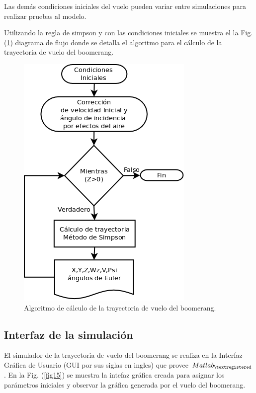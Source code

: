 	Las demás condiciones iniciales del vuelo pueden variar entre simulaciones para realizar pruebas al modelo.

	Utilizando la regla de simpson y con las condiciones iniciales se muestra el la Fig. (\ref{fig14}) diagrama de flujo donde se detalla el algoritmo para el cálculo de la trayectoria de vuelo del boomerang.

		\begin{figure}[h]
		\begin{center}
		\includegraphics[scale=0.4]{imagenes/3-boomerang/diag_flu_tra.png}
		\caption{Algoritmo de cálculo de la trayectoria de vuelo del boomerang.}
		\label{fig14}
		\end{center}
		\end{figure}

\newpage
	\subsection{Interfaz de la simulación}


	El simulador de la trayectoria de vuelo del boomerang se realiza en la Interfaz Gráfica de Usuario (GUI por sus siglas en ingles) que provee $Matlab_{\textregistered}$. En la Fig. (\ref{fig15}) se muestra la intefaz gráfica creada para asignar los parámetros iniciales y observar la gráfica generada por el vuelo del boomerang.

